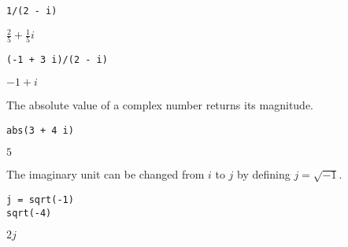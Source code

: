 \documentclass[12pt]{article}
\begin{document}
{\color{blue}
\begin{verbatim}
1/(2 - i)
\end{verbatim}
}

$\displaystyle \tfrac{2}{5}+\tfrac{1}{5}i$

{\color{blue}
\begin{verbatim}
(-1 + 3 i)/(2 - i)
\end{verbatim}
}

$\displaystyle -1+i$

\bigskip

The absolute value of a complex number returns its magnitude.

{\color{blue}
\begin{verbatim}
abs(3 + 4 i)
\end{verbatim}
}

$\displaystyle 5$

\bigskip

The imaginary unit can be changed from $i$ to $j$
by defining $j=\sqrt{-1}$.

{\color{blue}
\begin{verbatim}
j = sqrt(-1)
sqrt(-4)
\end{verbatim}
}

$\displaystyle 2j$
\end{document}
